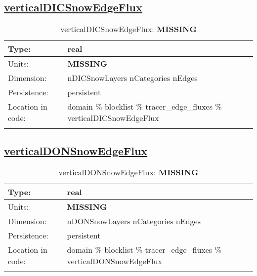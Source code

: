 \subsection[verticalDICSnowEdgeFlux]{\hyperref[sec:var_tab_tracer_edge_fluxes]{verticalDICSnowEdgeFlux}}
\label{subsec:var_sec_tracer_edge_fluxes_verticalDICSnowEdgeFlux}
\begin{center}
\begin{longtable}{| p{2.0in} | p{4.0in} |}
        \hline 
        Type: & real \\
        \hline 
        Units: & {\bf \color{red} MISSING} \\
        \hline 
        Dimension: & nDICSnowLayers nCategories nEdges \\
        \hline 
        Persistence: & persistent \\
        \hline 
         Location in code: & domain \% blocklist \% tracer\_edge\_fluxes \% verticalDICSnowEdgeFlux \\
         \hline 
    \caption{verticalDICSnowEdgeFlux: {\bf \color{red} MISSING}}
\end{longtable}
\end{center}
\subsection[verticalDONSnowEdgeFlux]{\hyperref[sec:var_tab_tracer_edge_fluxes]{verticalDONSnowEdgeFlux}}
\label{subsec:var_sec_tracer_edge_fluxes_verticalDONSnowEdgeFlux}
\begin{center}
\begin{longtable}{| p{2.0in} | p{4.0in} |}
        \hline 
        Type: & real \\
        \hline 
        Units: & {\bf \color{red} MISSING} \\
        \hline 
        Dimension: & nDONSnowLayers nCategories nEdges \\
        \hline 
        Persistence: & persistent \\
        \hline 
         Location in code: & domain \% blocklist \% tracer\_edge\_fluxes \% verticalDONSnowEdgeFlux \\
         \hline 
    \caption{verticalDONSnowEdgeFlux: {\bf \color{red} MISSING}}
\end{longtable}
\end{center}
